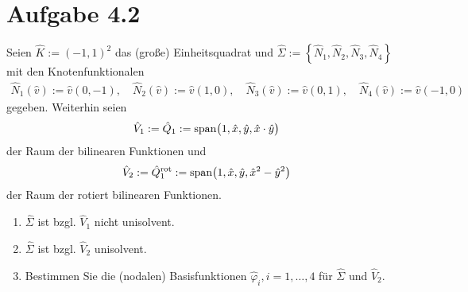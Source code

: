 \documentclass[12pt,a4paper]{article}
\begin{document}
\section*{Aufgabe 4.2}
Seien $\hat{K}:=(-1,1)^2$ das (große) Einheitsquadrat und $\hat{\Sigma}:=\left\lbrace\hat{N}_1,\hat{N}_2,\hat{N}_3,\hat{N}_4\right\rbrace$ mit den Knotenfunktionalen 
\begin{align*}
\hat{N}_1(\hat{v}):=\hat{v}(0,-1),\quad
\hat{N}_2(\hat{v}):=\hat{v}(1,0),\quad
\hat{N}_3(\hat{v}):=\hat{v}(0,1),\quad
\hat{N}_4(\hat{v}):=\hat{v}(-1,0)
\end{align*}
gegeben. Weiterhin seien 
\begin{align*}
\hat{V}_1:=\hat{Q}_1:=\text{span}\big(1,\hat{x},\hat{y},\hat{x}\cdot\hat{y}\big)
\end{align*}
der Raum der bilinearen Funktionen und
\begin{align*}
\hat{V}_2:=\hat{Q}_1^{\text{rot}}:=\text{span}\big(1,\hat{x},\hat{y},\hat{x}^2-\hat{y}^2\big)
\end{align*}
der Raum der rotiert bilinearen Funktionen.
\begin{enumerate}[label=(\alph*)]
\item $\hat{\Sigma}$ ist bzgl. $\hat{V}_1$ nicht unisolvent.
\item $\hat{\Sigma}$ ist bzgl. $\hat{V}_2$ unisolvent.
\item Bestimmen Sie die (nodalen) Basisfunktionen $\hat{\varphi}_i,i=1,\ldots,4$ für $\hat{\Sigma}$ und $\hat{V}_2$.
\end{enumerate}
\end{document}
